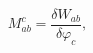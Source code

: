 \begin{equation}
M_{ab}^{c}=\frac{\delta W_{ab}}{\delta \varphi _{c}},  \label{c26}
\end{equation}

